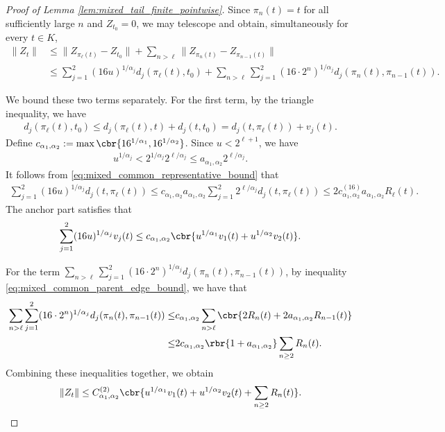 \documentclass[11pt]{article}
\begin{document}
\begin{proof}[Proof of Lemma
\ref{lem:mixed_tail_finite_pointwise}]
Since $\pi_n(t)=t$ for all sufficiently
large $n$ and $Z_{t_0}=0$, we may telescope and obtain, simultaneously
for every $t\in K$,
\begin{align*}
\|Z_t\|
&\le
\|Z_{\pi_\ell(t)}-Z_{t_0}\|
+
\sum_{n>\ell}
\|Z_{\pi_n(t)}-Z_{\pi_{n-1}(t)}\|\\
&\le
\sum_{j=1}^2
(16u)^{1/\alpha_j}
d_j(\pi_\ell(t),t_0)+
\sum_{n>\ell}
\sum_{j=1}^2
(16\cdot2^n)^{1/\alpha_j}
d_j(\pi_n(t),\pi_{n-1}(t)).
\end{align*}

We bound these two terms separately. For the first term, by the
triangle inequality, we have
\begin{align*}
d_j(\pi_\ell(t),t_0)\le
d_j(\pi_\ell(t),t)+d_j(t,t_0)=
d_j(t,\pi_\ell(t))+v_j(t).
\end{align*}
Define $c_{\alpha_1,\alpha_2}
:=
\max\cbr{16^{1/\alpha_1},16^{1/\alpha_2}}$. Since $u<2^{\ell+1}$, we have
\begin{align*}
u^{1/\alpha_j}
<
2^{1/\alpha_j}2^{\ell/\alpha_j}
\le
a_{\alpha_1,\alpha_2}2^{\ell/\alpha_j}.
\end{align*}
It follows from
\eqref{eq:mixed_common_representative_bound} that
\begin{align*}
\sum_{j=1}^2
(16u)^{1/\alpha_j}
d_j(t,\pi_\ell(t))\le
c_{\alpha_1,\alpha_2}
a_{\alpha_1,\alpha_2}
\sum_{j=1}^2
2^{\ell/\alpha_j}d_j(t,\pi_\ell(t))\le
2c_{\alpha_1,\alpha_2}^{(16)}
a_{\alpha_1,\alpha_2}R_\ell(t).
\end{align*}
The anchor part satisfies that
\begin{align*}\sum_{j=1}^2
(16u)^{1/\alpha_j}v_j(t)\le
c_{\alpha_1,\alpha_2}
\cbr{
u^{1/\alpha_1}v_1(t)
+
u^{1/\alpha_2}v_2(t)
}.
\end{align*}

For the term $\sum_{n>\ell}
\sum_{j=1}^2
(16\cdot2^n)^{1/\alpha_j}
d_j(\pi_n(t),\pi_{n-1}(t))$, by inequality
\eqref{eq:mixed_common_parent_edge_bound}, we have that
\begin{align*}
\sum_{n>\ell}
\sum_{j=1}^2
(16\cdot2^n)^{1/\alpha_j}
d_j(\pi_n(t),\pi_{n-1}(t))\le&
c_{\alpha_1,\alpha_2}
\sum_{n>\ell}
\cbr{
2R_n(t)
+
2a_{\alpha_1,\alpha_2}R_{n-1}(t)
}\\
\le&
2c_{\alpha_1,\alpha_2}
\rbr{1+a_{\alpha_1,\alpha_2}}
\sum_{n\ge2}R_n(t).
\end{align*}
Combining these inequalities together, we obtain
\begin{align}
\|Z_t\|
\le
C_{\alpha_1,\alpha_2}^{(2)}
\cbr{
u^{1/\alpha_1}v_1(t)
+
u^{1/\alpha_2}v_2(t)
+
\sum_{n\ge2}R_n(t)
}.
\label{eq:mixed_finite_pointwise_common_chain}
\end{align}


\end{proof}
\end{document}
